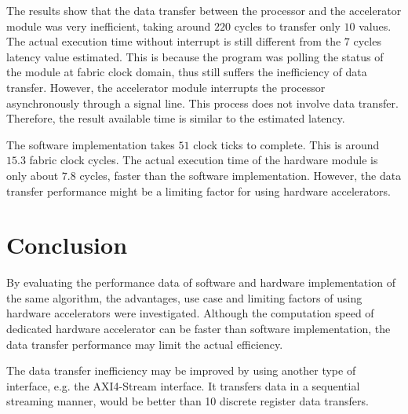 \documentclass[journal]{IEEEtran}
\begin{document}
The results show that the data transfer between the processor and the accelerator module was very inefficient, taking around $220$ cycles to transfer only $10$ values. The actual execution time without interrupt is still different from the $7$ cycles latency value estimated. This is because the program was polling the status of the module at fabric clock domain, thus still suffers the inefficiency of data transfer. However, the accelerator module interrupts the processor asynchronously through a signal line. This process does not involve data transfer. Therefore, the result available time is similar to the estimated latency.

The software implementation takes $51$ clock ticks to complete. This is around $15.3$ fabric clock cycles. The actual execution time of the hardware module is only about $7.8$ cycles, faster than the software implementation. However, the data transfer performance might be a limiting factor for using hardware accelerators.

\section{Conclusion}

By evaluating the performance data of software and hardware implementation of the same algorithm, the advantages, use case and limiting factors of using hardware accelerators were investigated. Although the computation speed of dedicated hardware accelerator can be faster than software implementation, the data transfer performance may limit the actual efficiency.

The data transfer inefficiency may be improved by using another type of interface, e.g. the AXI4-Stream interface. It transfers data in a sequential streaming manner, would be better than 10 discrete register data transfers.

%
%

\end{document}
